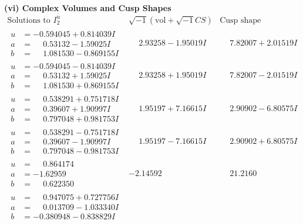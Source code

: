 \documentclass[1p]{elsarticle_modified}
\theoremstyle{definition}
\newcommand{\I}{\sqrt{-1}}
\begin{document}
\newpage\flushleft \textbf{(vi) Complex Volumes and Cusp Shapes}
$$\begin{array}{c|c|c}  
\text{Solutions to }I^u_{2}& \I (\text{vol} + \sqrt{-1}CS) & \text{Cusp shape}\\
 \hline 
\begin{aligned}
u &= -0.594045 + 0.814039 I \\
a &= \phantom{-}0.53132 - 1.59025 I \\
b &= \phantom{-}1.081530 - 0.869155 I\end{aligned}
 & \phantom{-}2.93258 - 1.95019 I & \phantom{-}7.82007 + 2.01519 I \\ \hline\begin{aligned}
u &= -0.594045 - 0.814039 I \\
a &= \phantom{-}0.53132 + 1.59025 I \\
b &= \phantom{-}1.081530 + 0.869155 I\end{aligned}
 & \phantom{-}2.93258 + 1.95019 I & \phantom{-}7.82007 - 2.01519 I \\ \hline\begin{aligned}
u &= \phantom{-}0.538291 + 0.751718 I \\
a &= \phantom{-}0.39607 + 1.90997 I \\
b &= \phantom{-}0.797048 + 0.981753 I\end{aligned}
 & \phantom{-}1.95197 + 7.16615 I & \phantom{-}2.90902 - 6.80575 I \\ \hline\begin{aligned}
u &= \phantom{-}0.538291 - 0.751718 I \\
a &= \phantom{-}0.39607 - 1.90997 I \\
b &= \phantom{-}0.797048 - 0.981753 I\end{aligned}
 & \phantom{-}1.95197 - 7.16615 I & \phantom{-}2.90902 + 6.80575 I \\ \hline\begin{aligned}
u &= \phantom{-}0.864174\phantom{ +0.000000I} \\
a &= -1.62959\phantom{ +0.000000I} \\
b &= \phantom{-}0.622350\phantom{ +0.000000I}\end{aligned}
 & -2.14592\phantom{ +0.000000I} & \phantom{-}21.2160\phantom{ +0.000000I} \\ \hline\begin{aligned}
u &= \phantom{-}0.947075 + 0.727756 I \\
a &= \phantom{-}0.013709 - 1.033340 I \\
b &= -0.380948 - 0.838829 I\end{aligned}

\end{array}$$
\end{document}
